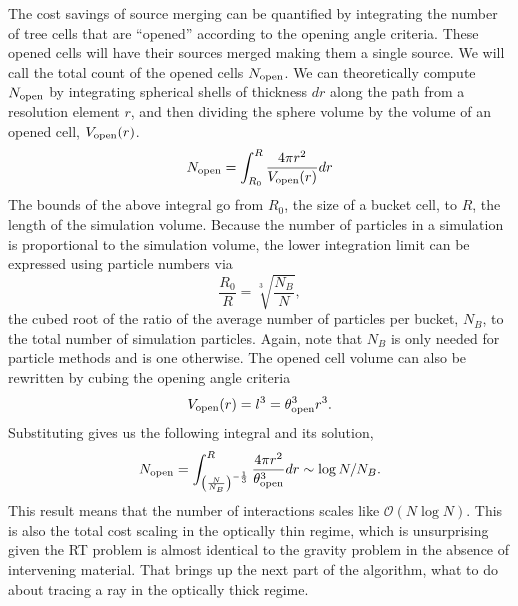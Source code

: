 \documentclass[fleq,usenatbib]{mnras}
\newcommand{\bigO}[1]{\mathcal{O}\left(#1\right)}
\newcommand{\tO}{\theta_{\rm open}}
\begin{document}
The cost savings of source merging can be quantified by integrating the number 
of tree cells that are ``opened'' according to the opening angle criteria. 
These opened cells will have their sources merged making them a single source. 
We will call the total count of the opened cells $N_{\rm open}$. We can 
theoretically compute $N_{\rm open}$ by integrating spherical shells of 
thickness $dr$ along the path from a resolution element $r$, and then dividing 
the sphere volume by the volume of an opened cell, $V_{\rm open}(r)$.
\begin{equation}
\label{eqn:nsint}
N_{\rm open} = \int_{R_0}^R \frac{4\pi r^2}{V_{\rm open}(r)} dr
\end{equation}
The bounds of the above integral go from $R_0$, the size of a bucket 
cell, to $R$, the length of the simulation volume. Because the number of 
particles in a simulation is proportional to the simulation volume, the 
lower integration limit can be expressed using particle numbers via 
\begin{equation}
\label{eqn:ratio}
\frac{R_0}{R} = \sqrt[3]{\frac{N_B}{N}},
\end{equation} 
the cubed root of the ratio of the average number of particles per bucket, 
$N_B$, to the total number of simulation particles. Again, note that $N_B$ is 
only needed for particle methods and is one otherwise. The opened cell volume 
can also be rewritten by cubing the opening angle criteria
\begin{equation}
\label{eqn:vcell}
V_{\rm open}(r) = l^3 = \tO^3 r^3.
\end{equation}
Substituting gives us the following integral and its solution,
\begin{equation}
\label{eqn:nssoln}
N_{\rm open} = \int_{\left(\frac{N}{N_B}\right)^{-\frac{1}{3}}}^R 
\frac{4\pi r^2}{\tO^3} dr
\sim \log{N/N_B}.
\end{equation}
This result means that the number of interactions scales like 
$\bigO{N \log N}$. This is also the total cost scaling in the optically 
thin regime, which is unsurprising given the RT problem is almost identical to 
the gravity problem in the absence of intervening material. That brings up the 
next part of the algorithm, what to do about tracing a ray in the optically 
thick regime.
\end{document}
